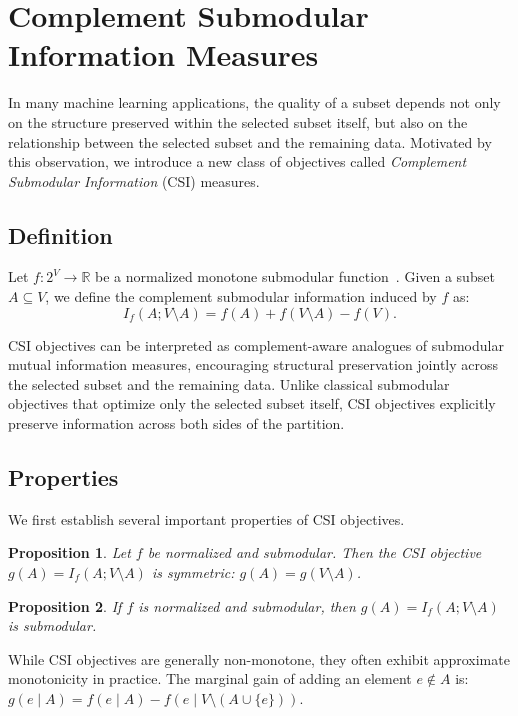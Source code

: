 \documentclass[11pt]{article}
\newtheorem{proposition}{Proposition}
\begin{document}
\section{Complement Submodular Information Measures}

In many machine learning applications, the quality of a subset depends not only on the structure preserved within the selected subset itself, but also on the relationship between the selected subset and the remaining data. Motivated by this observation, we introduce a new class of objectives called \emph{Complement Submodular Information} (CSI) measures.

\subsection{Definition}

Let $f:2^V \rightarrow \mathbb{R}$ be a normalized monotone submodular function~\cite{fujishige2005submodular}. Given a subset $A \subseteq V$, we define the complement submodular information induced by $f$ as:
\[
I_f(A;V\setminus A)
=
f(A)+f(V\setminus A)-f(V).
\]

CSI objectives can be interpreted as complement-aware analogues of submodular mutual information measures, encouraging structural preservation jointly across the selected subset and the remaining data. Unlike classical submodular objectives that optimize only the selected subset itself, CSI objectives explicitly preserve information across both sides of the partition.

\subsection{Properties}

We first establish several important properties of CSI objectives.

\begin{proposition}
Let $f$ be normalized and submodular. Then the CSI objective $g(A)=I_f(A;V\setminus A)$
is symmetric: $g(A)=g(V\setminus A)$.
\end{proposition}

\begin{proposition}
If $f$ is normalized and submodular, then $g(A)=I_f(A;V\setminus A)$
is submodular.
\end{proposition}

While CSI objectives are generally non-monotone, they often exhibit approximate monotonicity in practice. The marginal gain of adding an element $e \notin A$ is: $g(e\mid A)
=
f(e\mid A)
-
f(e\mid V\setminus(A\cup\{e\}))$.
\end{document}
